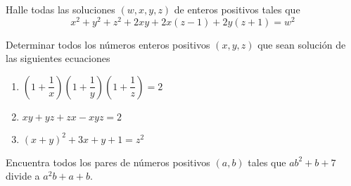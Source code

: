 \begin{exercise}
    Halle todas las soluciones $(w,x,y,z)$ de enteros positivos tales que
    \[
        x^2 + y^2 + z^2 + 2xy + 2x(z - 1) + 2y(z + 1) = w^2
    \]
\end{exercise}

\begin{exercise}
    Determinar todos los números enteros positivos $(x,y,z)$ que sean solución de las siguientes ecuaciones
    \begin{enumerate}
        \item $\left(1 + \dfrac{1}{x}\right)\left(1 + \dfrac{1}{y}\right)\left(1 + \dfrac{1}{z}\right) = 2$
        \item $xy + yz + zx - xyz = 2$
        \item $(x + y)^2 + 3x + y + 1 = z^2$
    \end{enumerate}
\end{exercise}

\begin{exercise}
    Encuentra todos los pares de números positivos $(a, b)$ tales que $ab^2 + b + 7$ divide a $a^2 b + a + b$.
\end{exercise}